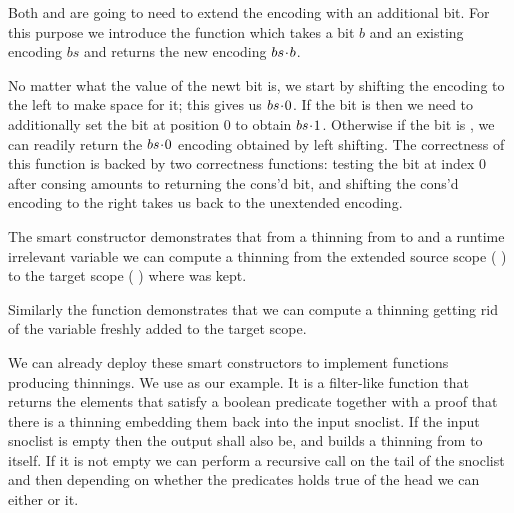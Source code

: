 
Both  and  are going to need to extend the
encoding with an additional bit.
%
For this purpose we introduce the  function which takes a bit
$b$ and an existing encoding $bs$ and returns the new encoding $bs\!\cdot{}\!b$.


No matter what the value of the newt bit is, we start by shifting the encoding to
the left to make space for it; this gives us $bs\!\cdot{}\!0$.
%
If the bit is  then we need to additionally set the bit at position
$0$ to obtain $bs\!\cdot{}\!1$. Otherwise if the bit is , we can readily
return the $bs\!\cdot{}\!0$ encoding obtained by left shifting.
%
The correctness of this function is backed by two correctness functions:
testing the bit at index $0$ after consing amounts to returning the cons'd bit,
and shifting the cons'd encoding to the right takes us back to the unextended
encoding.


The  smart constructor demonstrates that from a thinning from
 to  and a runtime irrelevant variable 
we can compute a thinning from the extended source scope
( \IdrisData{:<} ) to the target scope
( \IdrisData{:<} ) where  was kept.


Similarly the  function demonstrates that we can compute a
thinning getting rid of the variable  freshly added to the target
scope.


We can already deploy these smart constructors to implement functions producing
thinnings. We use  as our example. It is a filter-like
function that returns the elements that satisfy a boolean predicate together with
a proof that there is a thinning embedding them back into the input snoclist.
%
If the input snoclist is empty then the output shall also be, and
 builds a thinning from \IdrisData{[<]} to itself.
%
If it is not empty we can perform a recursive call on the tail of the snoclist
and then depending on whether the predicates holds true of the head we can either
 or  it.


